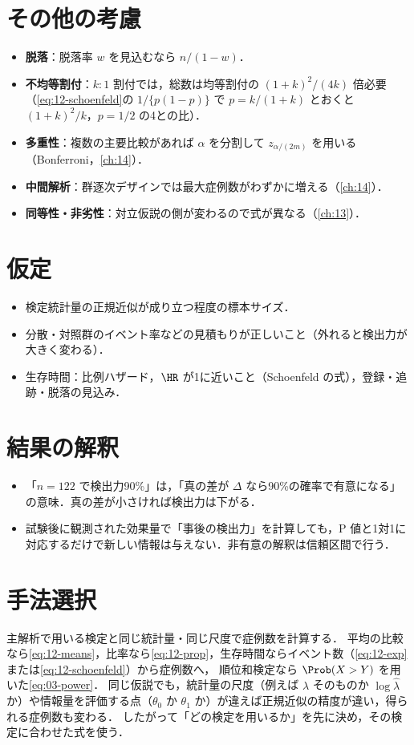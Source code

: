 \section{その他の考慮}\label{sec:12-other}
\begin{itemize}
\item \textbf{脱落}：脱落率 $w$ を見込むなら $n/(1-w)$．
\item \textbf{不均等割付}：$k:1$ 割付では，総数は均等割付の $(1+k)^2/(4k)$ 倍必要（\cref{eq:12-schoenfeld}の $1/\{p(1-p)\}$ で $p=k/(1+k)$ とおくと $(1+k)^2/k$，$p=1/2$ の4との比）．
\item \textbf{多重性}：複数の主要比較があれば $\alpha$ を分割して $z_{\alpha/(2m)}$ を用いる（Bonferroni，\cref{ch:14}）．
\item \textbf{中間解析}：群逐次デザインでは最大症例数がわずかに増える（\cref{ch:14}）．
\item \textbf{同等性・非劣性}：対立仮説の側が変わるので式が異なる（\cref{ch:13}）．
\end{itemize}

\section{仮定}\label{sec:12-assump}
\begin{itemize}
\item 検定統計量の正規近似が成り立つ程度の標本サイズ．
\item 分散・対照群のイベント率などの見積もりが正しいこと（外れると検出力が大きく変わる）．
\item 生存時間：比例ハザード，$\HR$ が1に近いこと（Schoenfeld の式），登録・追跡・脱落の見込み．
\end{itemize}

\section{結果の解釈}\label{sec:12-interp}
\begin{itemize}
\item 「$n=122$ で検出力90\%」は，「真の差が $\Delta$ なら90\%の確率で有意になる」の意味．真の差が小さければ検出力は下がる．
\item 試験後に観測された効果量で「事後の検出力」を計算しても，P 値と1対1に対応するだけで新しい情報は与えない．非有意の解釈は信頼区間で行う．
\end{itemize}

\section{手法選択}\label{sec:12-choice}
主解析で用いる検定と同じ統計量・同じ尺度で症例数を計算する．
平均の比較なら\cref{eq:12-means}，比率なら\cref{eq:12-prop}，生存時間ならイベント数（\cref{eq:12-exp}または\cref{eq:12-schoenfeld}）から症例数へ，
順位和検定なら $\Prob(X>Y)$ を用いた\cref{eq:03-power}．
同じ仮説でも，統計量の尺度（例えば $\hat\lambda$ そのものか $\log\hat\lambda$ か）や情報量を評価する点（$\theta_0$ か $\theta_1$ か）が違えば正規近似の精度が違い，得られる症例数も変わる．
したがって「どの検定を用いるか」を先に決め，その検定に合わせた式を使う．

